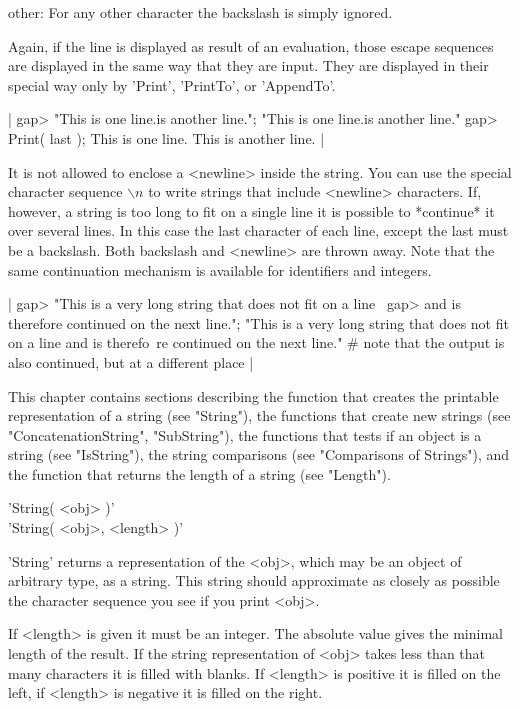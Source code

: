 other:  For any other character the backslash is simply ignored.

Again, if the line is displayed as result of  an evaluation, those escape
sequences are displayed in the  same way that they  are input.  They  are
displayed in their special way only by 'Print', 'PrintTo', or 'AppendTo'.

|    gap> "This is one line.\nThis is another line.\n";
    "This is one line.\nThis is another line.\n"
    gap> Print( last );
    This is one line.
    This is another line. |

It is not allowed to enclose a <newline> inside the  string.  You can use
the special  character  sequence  $\backslash n$  to  write  strings that
include <newline>  characters.  If, however, a string  is too long to fit
on a single line it is possible to *continue* it  over several lines.  In
this case  the last character of  each  line, except the  last  must be a
backslash.  Both backslash and <newline>  are thrown away.  Note that the
same continuation mechanism is available for identifiers and integers.

|    gap> "This is a very long string that does not fit on a line \
    gap> and is therefore continued on the next line.";
    "This is a very long string that does not fit on a line and is therefo\
    re continued on the next line."
    # note that the output is also continued, but at a different place |

This chapter contains sections  describing  the function that creates the
printable representation  of a string  (see "String"), the functions that
create new   strings  (see    "ConcatenationString",  "SubString"),   the
functions that tests  if an object  is   a  string  (see "IsString"), the
string comparisons (see "Comparisons of Strings"), and the  function that
returns the length of a string (see "Length").

%
\index{convert!to a string}

'String( <obj> )' \\
'String( <obj>, <length> )'

'String' returns a representation of the <obj>, which may be an object of
arbitrary type, as a string.   This string should approximate  as closely
as possible the character sequence you see if you print <obj>.

If <length> is given it must be an integer.  The absolute value gives the
minimal  length of the  result.  If  the string  representation of  <obj>
takes  less than that  many  characters  it is   filled with blanks.   If
<length> is positive it is filled on the left, if <length> is negative it
is filled on the right.

